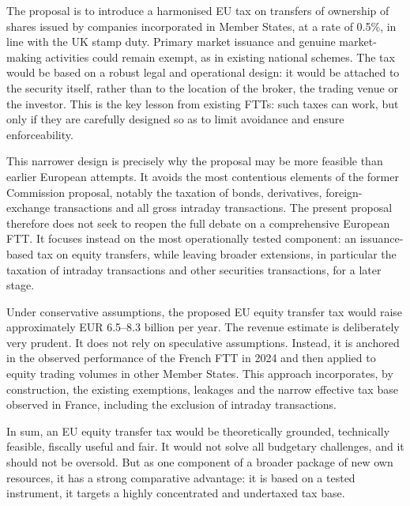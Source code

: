\documentclass[../../main]{subfiles}
\begin{document}

The proposal is to introduce a harmonised EU tax on transfers of ownership of shares issued by companies incorporated in Member States, at a rate of 0.5\%, in line with the UK stamp duty. Primary market issuance and genuine market-making activities could remain exempt, as in existing national schemes. The tax would be based on a robust legal and operational design: it would be attached to the security itself, rather than to the location of the broker, the trading venue or the investor. This is the key lesson from existing FTTs: such taxes can work, but only if they are carefully designed so as to limit avoidance and ensure enforceability.

This narrower design is precisely why the proposal may be more feasible than earlier European attempts. It avoids the most contentious elements of the former Commission proposal, notably the taxation of bonds, derivatives, foreign-exchange transactions and all gross intraday transactions. The present proposal therefore does not seek to reopen the full debate on a comprehensive European FTT. It focuses instead on the most operationally tested component: an issuance-based tax on equity transfers, while leaving broader extensions, in particular the taxation of intraday transactions and other securities transactions, for a later stage.

Under conservative assumptions, the proposed EU equity transfer tax would raise approximately EUR 6.5--8.3 billion per year. The revenue estimate is deliberately very prudent. It does not rely on speculative assumptions. Instead, it is anchored in the observed performance of the French FTT in 2024 and then applied to equity trading volumes in other Member States. This approach incorporates, by construction, the existing exemptions, leakages and the narrow effective tax base observed in France, including the exclusion of intraday transactions. 

In sum, an EU equity transfer tax would be theoretically grounded, technically feasible, fiscally useful and fair. It would not solve all budgetary challenges, and it should not be oversold. But as one component of a broader package of new own resources, it has a strong comparative advantage: it is based on a tested instrument, it targets a highly concentrated and undertaxed tax base.
\end{document}
